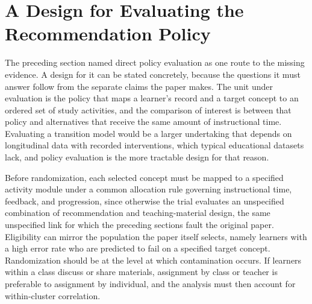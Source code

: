 \documentclass[11pt]{article}
\begin{document}
\section{A Design for Evaluating the Recommendation Policy}

The preceding section named direct policy evaluation as one route to the missing evidence. A design for it can be stated concretely, because the questions it must answer follow from the separate claims the paper makes. The unit under evaluation is the policy that maps a learner's record and a target concept to an ordered set of study activities, and the comparison of interest is between that policy and alternatives that receive the same amount of instructional time. Evaluating a transition model would be a larger undertaking that depends on longitudinal data with recorded interventions, which typical educational datasets lack, and policy evaluation is the more tractable design for that reason.

Before randomization, each selected concept must be mapped to a specified activity module under a common allocation rule governing instructional time, feedback, and progression, since otherwise the trial evaluates an unspecified combination of recommendation and teaching-material design, the same unspecified link for which the preceding sections fault the original paper. Eligibility can mirror the population the paper itself selects, namely learners with a high error rate who are predicted to fail on a specified target concept. Randomization should be at the level at which contamination occurs. If learners within a class discuss or share materials, assignment by class or teacher is preferable to assignment by individual, and the analysis must then account for within-cluster correlation. 
\end{document}
